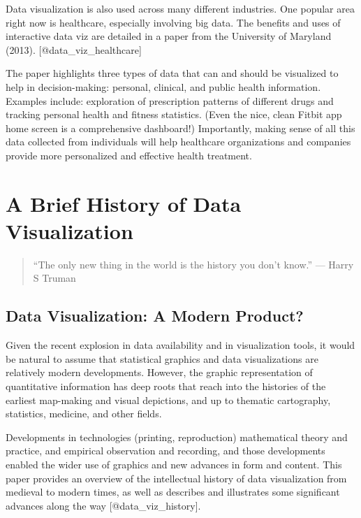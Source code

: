 \documentclass[]{book}
\theoremstyle{definition}
\theoremstyle{definition}
\theoremstyle{definition}
\theoremstyle{remark}
\begin{document}
Data visualization is also used across many different industries. One
popular area right now is healthcare, especially involving big data. The
benefits and uses of interactive data viz are detailed in a paper from
the University of Maryland (2013). {[}@data\_viz\_healthcare{]}

The paper highlights three types of data that can and should be
visualized to help in decision-making: personal, clinical, and public
health information. Examples include: exploration of prescription
patterns of different drugs and tracking personal health and fitness
statistics. (Even the nice, clean Fitbit app home screen is a
comprehensive dashboard!) Importantly, making sense of all this data
collected from individuals will help healthcare organizations and
companies provide more personalized and effective health treatment.

\section{A Brief History of Data
Visualization}\label{a-brief-history-of-data-visualization}

\begin{quote}
``The only new thing in the world is the history you don't know.'' ---
Harry S Truman
\end{quote}

\subsection{Data Visualization: A Modern
Product?}\label{data-visualization-a-modern-product}

Given the recent explosion in data availability and in visualization
tools, it would be natural to assume that statistical graphics and data
visualizations are relatively modern developments. However, the graphic
representation of quantitative information has deep roots that reach
into the histories of the earliest map-making and visual depictions, and
up to thematic cartography, statistics, medicine, and other fields.

Developments in technologies (printing, reproduction) mathematical
theory and practice, and empirical observation and recording, and those
developments enabled the wider use of graphics and new advances in form
and content. This paper provides an overview of the intellectual history
of data visualization from medieval to modern times, as well as
describes and illustrates some significant advances along the way
{[}@data\_viz\_history{]}.
\end{document}
